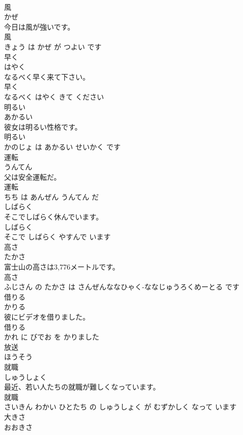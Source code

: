 \documentclass[8pt]{extreport}
\begin{document}
\begin{CJK}{UTF8}{min}
\\	風	
\\	かぜ			
\\	今日は風が強いです。	
\\	風 
\\	きょう は かぜ が つよい です			
\\	早く	
\\	はやく			
\\	なるべく早く来て下さい。	
\\	早く 
\\	なるべく はやく きて ください			
\\	明るい	
\\	あかるい			
\\	彼女は明るい性格です。	
\\	明るい 
\\	かのじょ は あかるい せいかく です			
\\	運転	
\\	うんてん			
\\	父は安全運転だ。	
\\	運転 
\\	ちち は あんぜん うんてん だ			
\\	しばらく	
\\	そこでしばらく休んでいます。	
\\	しばらく 
\\	そこで しばらく やすんで います			
\\	高さ	
\\	たかさ			
\\	富士山の高さは3,776メートルです。	
\\	高さ 
\\	ふじさん の たかさ は さんぜんななひゃく-ななじゅうろくめーとる です			
\\	借りる	
\\	かりる			
\\	彼にビデオを借りました。	
\\	借りる 
\\	かれ に びでお を かりました			
\\	放送	
\\	ほうそう			
\\	就職	
\\	しゅうしょく			
\\	最近、若い人たちの就職が難しくなっています。	
\\	就職 
\\	さいきん わかい ひとたち の しゅうしょく が むずかしく なって います			
\\	大きさ	
\\	おおきさ			

\end{CJK}
\end{document}
